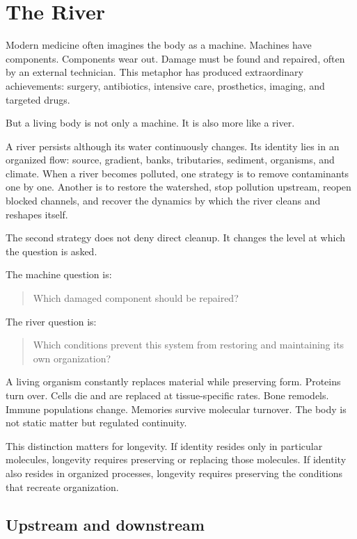 \chapter{The River}

Modern medicine often imagines the body as a machine. Machines have components. Components wear out. Damage must be found and repaired, often by an external technician. This metaphor has produced extraordinary achievements: surgery, antibiotics, intensive care, prosthetics, imaging, and targeted drugs.

But a living body is not only a machine. It is also more like a river.

A river persists although its water continuously changes. Its identity lies in an organized flow: source, gradient, banks, tributaries, sediment, organisms, and climate. When a river becomes polluted, one strategy is to remove contaminants one by one. Another is to restore the watershed, stop pollution upstream, reopen blocked channels, and recover the dynamics by which the river cleans and reshapes itself.

The second strategy does not deny direct cleanup. It changes the level at which the question is asked.

The machine question is:

\begin{quote}
Which damaged component should be repaired?
\end{quote}

The river question is:

\begin{quote}
Which conditions prevent this system from restoring and maintaining its own organization?
\end{quote}

A living organism constantly replaces material while preserving form. Proteins turn over. Cells die and are replaced at tissue-specific rates. Bone remodels. Immune populations change. Memories survive molecular turnover. The body is not static matter but regulated continuity.

This distinction matters for longevity. If identity resides only in particular molecules, longevity requires preserving or replacing those molecules. If identity also resides in organized processes, longevity requires preserving the conditions that recreate organization.

\section{Upstream and downstream}

